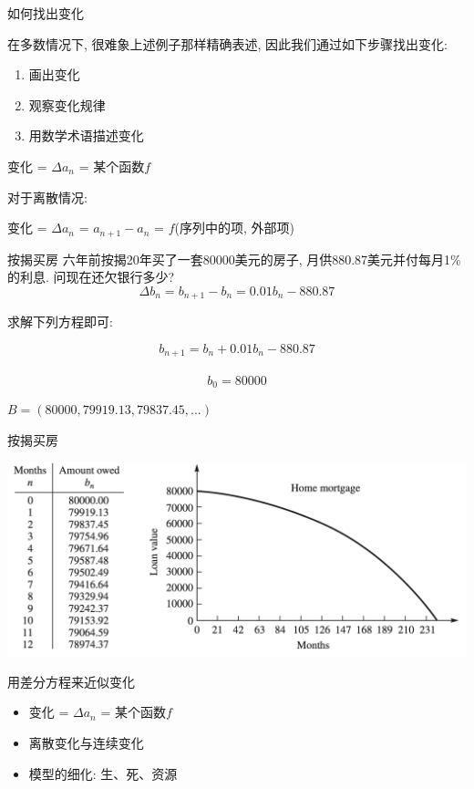 \documentclass[UTF8]{ctexbeamer}
\begin{document}
\begin{frame}{如何找出变化}

在多数情况下, 很难象上述例子那样精确表述, 因此我们通过如下步骤找出变化:

\begin{enumerate}
\item 画出变化
\item 观察变化规律
\item 用数学术语描述变化
\end{enumerate}

变化 = $\Delta a_n$ = 某个函数$f$

对于离散情况:

变化 = $\Delta a_n$ = $a_{n+1} - a_n$ = $f$(序列中的项, 外部项)
\end{frame}

\begin{frame}{按揭买房}
六年前按揭20年买了一套80000美元的房子, 月供880.87美元并付每月1\%的利息. 问现在还欠银行多少?
\[
\Delta b_n = b_{n+1} - b_n = 0.01b_n - 880.87
\]

求解下列方程即可:

\begin{block}{}
\[
b_{n+1} = b_n + 0.01b_n - 880.87
\]\\[-25pt]
\[
b_0 = 80000
\]
\end{block}

$B = (80000, 79919.13, 79837.45, ...)$
\end{frame}

\begin{frame}{按揭买房}
  \begin{center}
    \includegraphics[width=.9\textwidth{}]{mort.png}
  \end{center}
\end{frame}

\begin{frame}{用差分方程来近似变化}

  \begin{itemize}
  \item 变化 = $\Delta a_n$ = 某个函数$f$
  \item 离散变化与连续变化
  \item 模型的细化: 生、死、资源
  \end{itemize}
\end{frame}
\end{document}
